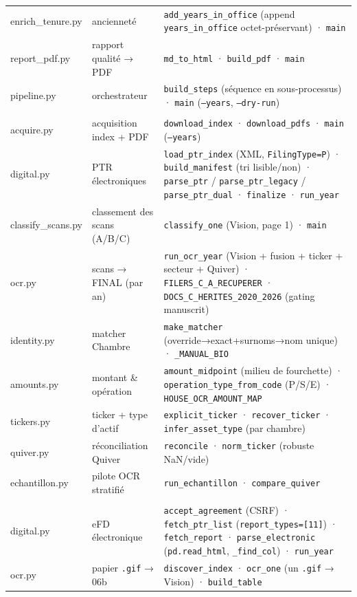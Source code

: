 \documentclass[11pt,a4paper]{article}
\newcommand{\co}[1]{\texttt{\small #1}}
\begin{document}
{\begin{longtable}{>{\ttfamily\footnotesize}p{2.6cm} p{3.9cm} p{8.6cm}}
enrich_tenure.py & ancienneté & \co{add_years_in_office} (append \co{years_in_office} octet-préservant) · \co{main} \\
report_pdf.py & rapport qualité → PDF & \co{md_to_html} · \co{build_pdf} · \co{main} \\
pipeline.py & orchestrateur & \co{build_steps} (séquence en sous-processus) · \co{main} (\co{--years}, \co{--dry-run}) \\
\midrule
\multicolumn{3}{l}{\bfseries\color{houseC} house/ — orchestrateur Chambre (9)}\\
acquire.py & acquisition index + PDF & \co{download_index} · \co{download_pdfs} · \co{main} (\co{--years}) \\
digital.py & PTR électroniques & \co{load_ptr_index} (XML, \co{FilingType=P}) · \co{build_manifest} (tri lisible/non) · \co{parse_ptr} / \co{parse_ptr_legacy} / \co{parse_ptr_dual} · \co{finalize} · \co{run_year} \\
classify_scans.py & classement des scans (A/B/C) & \co{classify_one} (Vision, page 1) · \co{main} \\
ocr.py & scans → FINAL (par an) & \co{run_ocr_year} (Vision + fusion + ticker + secteur + Quiver) · \co{FILERS_C_A_RECUPERER} · \co{DOCS_C_HERITES_2020_2026} (gating manuscrit) \\
identity.py & matcher Chambre & \co{make_matcher} (override→exact+surnoms→nom unique) · \co{_MANUAL_BIO} \\
amounts.py & montant \& opération & \co{amount_midpoint} (milieu de fourchette) · \co{operation_type_from_code} (P/S/E) · \co{HOUSE_OCR_AMOUNT_MAP} \\
tickers.py & ticker + type d'actif & \co{explicit_ticker} · \co{recover_ticker} · \co{infer_asset_type} (par chambre) \\
quiver.py & réconciliation Quiver & \co{reconcile} · \co{norm_ticker} (robuste NaN/vide) \\
echantillon.py & pilote OCR stratifié & \co{run_echantillon} · \co{compare_quiver} \\
\midrule
\multicolumn{3}{l}{\bfseries\color{senateC} senate/ — orchestrateur Sénat (8)}\\
digital.py & eFD électronique & \co{accept_agreement} (CSRF) · \co{fetch_ptr_list} (\co{report_types=[11]}) · \co{fetch_report} · \co{parse_electronic} (\co{pd.read_html}, \co{_find_col}) · \co{run_year} \\
ocr.py & papier \co{.gif} → 06b & \co{discover_index} · \co{ocr_one} (un \co{.gif} → Vision) · \co{build_table} \\

\end{longtable}}
\end{document}
